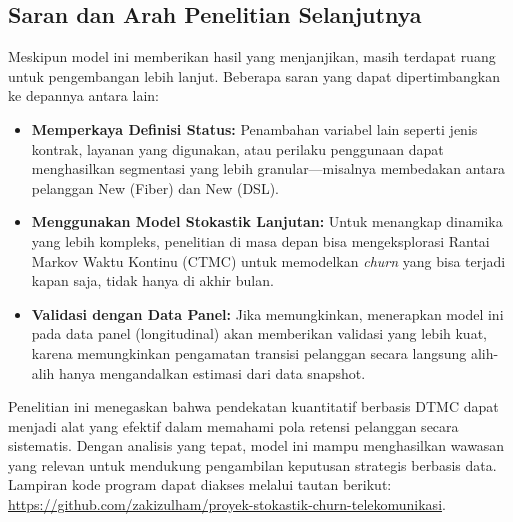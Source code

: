 \documentclass[a4paper,12pt]{article}
\begin{document}
\subsection*{Saran dan Arah Penelitian Selanjutnya}
Meskipun model ini memberikan hasil yang menjanjikan, masih terdapat ruang untuk pengembangan lebih lanjut. Beberapa saran yang dapat dipertimbangkan ke depannya antara lain:
\begin{itemize}
    \item \textbf{Memperkaya Definisi Status:} Penambahan variabel lain seperti jenis kontrak, layanan yang digunakan, atau perilaku penggunaan dapat menghasilkan segmentasi yang lebih granular—misalnya membedakan antara pelanggan New (Fiber) dan New (DSL).
    \item \textbf{Menggunakan Model Stokastik Lanjutan:} Untuk menangkap dinamika yang lebih kompleks, penelitian di masa depan bisa mengeksplorasi Rantai Markov Waktu Kontinu (CTMC) untuk memodelkan \textit{churn} yang bisa terjadi kapan saja, tidak hanya di akhir bulan.
    \item \textbf{Validasi dengan Data Panel:} Jika memungkinkan, menerapkan model ini pada data panel (longitudinal) akan memberikan validasi yang lebih kuat, karena memungkinkan pengamatan transisi pelanggan secara langsung alih-alih hanya mengandalkan estimasi dari data snapshot.
\end{itemize}

Penelitian ini menegaskan bahwa pendekatan kuantitatif berbasis DTMC dapat menjadi alat yang efektif dalam memahami pola retensi pelanggan secara sistematis. Dengan analisis yang tepat, model ini mampu menghasilkan wawasan yang relevan untuk mendukung pengambilan keputusan strategis berbasis data. Lampiran kode program dapat diakses melalui tautan berikut: \href{https://github.com/zakizulham/proyek-stokastik-churn-telekomunikasi}{https://github.com/zakizulham/proyek-stokastik-churn-telekomunikasi}.


\newpage



\end{document}
